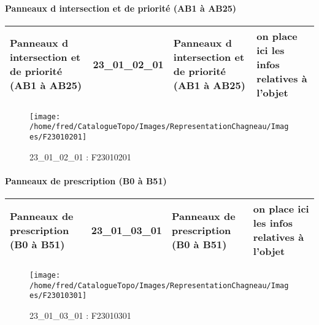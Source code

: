 \documentclass[12pt,titlepage,oneside]{book}
\begin{document}
\paragraph{Panneaux d intersection et de priorité (AB1 à AB25)}
\noindent
\vspace{\baselineskip}

\renewcommand{\arraystretch}{1.2}
\begin{supertabular}{|p{10cm}|c|p{13cm}|p{12cm}|}
 Panneaux d intersection et de priorité (AB1 à AB25) & 23\_01\_02\_01 & Panneaux d intersection et de priorité (AB1 à AB25) & on place ici les infos relatives à l'objet\\
\hline
\end{supertabular}
\begin{figure}[h!]
  \hfill         %
  \begin{minipage}[t]{3cm}
    \begin{center}
      \texttt{[image: /home/fred/CatalogueTopo/Images/RepresentationChagneau/Images/F23010201]}
      \caption[F23010201]{\label{} 23\_01\_02\_01 : F23010201}
    \end{center}
  \end{minipage}
\end{figure}


\paragraph{Panneaux de prescription (B0 à B51)}
\noindent
\vspace{\baselineskip}

\renewcommand{\arraystretch}{1.2}
\begin{supertabular}{|p{10cm}|c|p{13cm}|p{12cm}|}
 Panneaux de prescription (B0 à B51) & 23\_01\_03\_01 & Panneaux de prescription (B0 à B51) & on place ici les infos relatives à l'objet\\
\hline
\end{supertabular}
\begin{figure}[h!]
  \hfill         %
  \begin{minipage}[t]{3cm}
    \begin{center}
      \texttt{[image: /home/fred/CatalogueTopo/Images/RepresentationChagneau/Images/F23010301]}
      \caption[F23010301]{\label{} 23\_01\_03\_01 : F23010301}
    \end{center}
  \end{minipage}
\end{figure}
\end{document}
